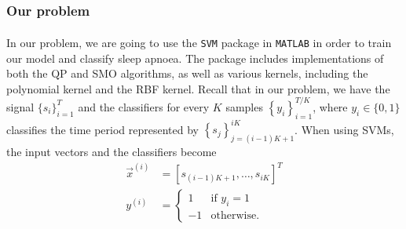 \subsubsection{Our problem}
	In our problem, we are going to use the \verb!SVM! package in \verb!MATLAB!\textsuperscript{\textregistered} in order to train our model and classify sleep apnoea. The package includes implementations of both the QP and SMO algorithms, as well as various kernels, including the polynomial kernel and the RBF kernel. Recall that in our problem, we have the signal $\{ s_i \}_{i = 1}^T$ and the classifiers for every $K$ samples $\left\{ y_i \right\}_{i = 1}^{T/K}$, where $y_i \in \{0, 1\}$ classifies the time period represented by $\left\{ s_j \right\}_{j = (i - 1)K + 1}^{iK}$. When using SVMs, the input vectors and the classifiers become
	\begin{align*}
		\vec x^{(i)} 	& = [ s_{ (i - 1)K + 1}, \dotsc, s_{iK} ]^T \\
		y^{(i)} 	& = 
		\begin{cases}
			1	& \text{if } y_i  = 1 \\
			-1	& \text{otherwise.}
		\end{cases}
	\end{align*}